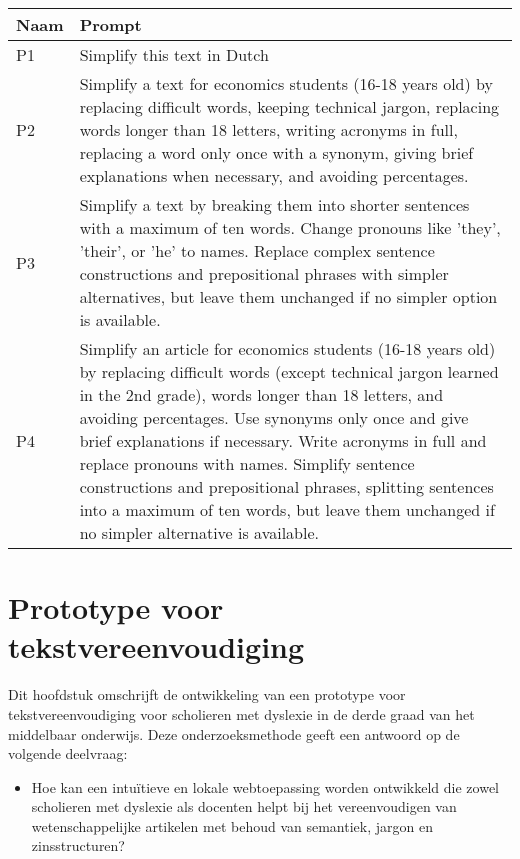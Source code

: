 \begin{center}
	\begin{tabular}{ | m{4cm} | m{12cm} | } 
		\hline
		\textbf{Naam} & \textbf{Prompt} \\
		\hline
		P1 & Simplify this text in Dutch \\
		\hline
		P2 & Simplify a text for economics students (16-18 years old) by replacing difficult words, keeping technical jargon, replacing words longer than 18 letters, writing acronyms in full, replacing a word only once with a synonym, giving brief explanations when necessary, and avoiding percentages. \\
		\hline
		P3 & Simplify a text by breaking them into shorter sentences with a maximum of ten words. Change pronouns like 'they', 'their', or 'he' to names. Replace complex sentence constructions and prepositional phrases with simpler alternatives, but leave them unchanged if no simpler option is available. \\
		\hline
		P4 & Simplify an article for economics students (16-18 years old) by replacing difficult words (except technical jargon learned in the 2nd grade), words longer than 18 letters, and avoiding percentages. Use synonyms only once and give brief explanations if necessary. Write acronyms in full and replace pronouns with names. Simplify sentence constructions and prepositional phrases, splitting sentences into a maximum of ten words, but leave them unchanged if no simpler alternative is available. \\
		\hline
	\end{tabular}
	\label{table:technologies}
\end{center}

\section{Prototype voor tekstvereenvoudiging}

Dit hoofdstuk omschrijft de ontwikkeling van een prototype voor tekstvereenvoudiging voor scholieren met dyslexie in de derde graad van het middelbaar onderwijs. Deze onderzoeksmethode geeft een antwoord op de volgende deelvraag: 

\begin{itemize}
	\item Hoe kan een intuïtieve en lokale webtoepassing worden ontwikkeld die zowel scholieren met dyslexie als docenten helpt bij het vereenvoudigen van wetenschappelijke artikelen met behoud van semantiek, jargon en zinsstructuren?
\end{itemize}

